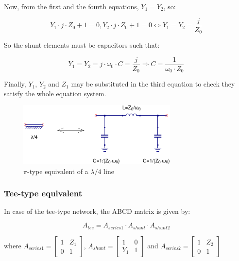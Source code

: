 \noindent Now, from the first and the fourth equations, $Y_1 = Y_2$, so:

\begin{equation}
Y_1 \cdot j \cdot Z_0 + 1 = 0, Y_2 \cdot j \cdot Z_0 + 1 = 0 \iff Y_1 = Y_2 = \dfrac{j}{Z_0}
\end{equation}

\noindent So the shunt elements must be capacitors such that:

\begin{equation}
Y_1 = Y_2 = j \cdot \omega_0 \cdot C = \dfrac{j}{Z_0} \Longrightarrow C = \dfrac{1}{\omega_0 \cdot Z_0}
\end{equation}

\noindent Finally, $Y_1$, $Y_2$ and $Z_1$ may be substituted in the third equation to check they satisfy the whole equation system.

\begin{figure}[ht]
\begin{center}
\includegraphics[width=8cm]{bitmaps/synthesis/attenuators/Pi-equivalent-l4}
\end{center}
\caption{$\pi$-type equivalent of a $\lambda/4$ line}
\label{fig:pi-eq-l4}
\end{figure}
\FloatBarrier

\subsubsection{Tee-type equivalent}

\noindent In case of the tee-type network, the ABCD matrix is given by: 

\begin{equation}
A_{tee} = A_{series1} \cdot A_{shunt} \cdot A_{shunt2}
\end{equation}

\noindent where $A_{series1} = \begin{bmatrix} 1 & Z_1  \\ 0 & 1 \end{bmatrix}$, $A_{shunt} = \begin{bmatrix} 1 & 0  \\ Y_1 & 1 \end{bmatrix}$ and $A_{series2} = \begin{bmatrix} 1 & Z_2  \\ 0 & 1 \end{bmatrix}$

